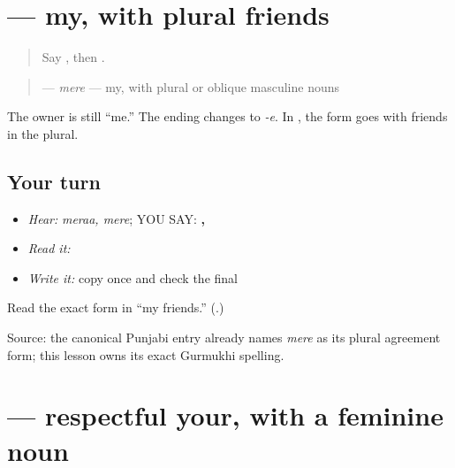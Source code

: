 \section[\texorpdfstring{\pa{ਮੇਰੇ} (mere)}{ਮੇਰੇ (mere)}]{ — my, with plural friends}

\label{lesson:PA-C185-mere}



\begin{quote}
Say \textbf{}, then \textbf{}.
\end{quote}

\begin{grammarlens}[title={Grammar Lens: use the \emph{-e} agreement form}]
\begin{quote}
\textbf{} — \emph{mere} — my, with plural or oblique masculine nouns
\end{quote}

The owner is still “me.” The ending changes to \emph{-e}. In \textbf{ }, the form goes with friends in the plural.
\end{grammarlens}

\subsection*{Your turn}
\begin{itemize}
\raggedright
  \item \emph{Hear:} \emph{meraa, mere}; YOU SAY: \textbf{, }
  \item \emph{Read it:} \textbf{ }
  \item \emph{Write it:} copy \textbf{} once and check the final \textbf{}
\end{itemize}

\begin{tcolorbox}[breakable,colback=teal!4,colframe=teal!35!black,title={Before you move on}]
Read the exact form in “my friends.” (\textbf{}.)

Source: the canonical Punjabi \textbf{} entry already names \emph{mere} as its plural agreement form; this lesson owns its exact Gurmukhi spelling.
\end{tcolorbox}
\section[\texorpdfstring{\pa{ਤੁਹਾਡੀ} (tuhaadii)}{ਤੁਹਾਡੀ (tuhaadii)}]{ — respectful your, with a feminine noun}

